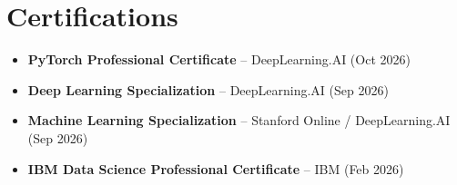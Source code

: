 \documentclass[letterpaper,11pt]{article}
\newenvironment{cvitems}{\begin{itemize}[leftmargin=0.21in,topsep=2pt,itemsep=1pt,parsep=0pt,partopsep=0pt]}{\end{itemize}}
\begin{document}
\section*{Certifications}
\begin{cvitems}
  \item \textbf{PyTorch Professional Certificate} -- DeepLearning.AI (Oct 2026)
  \item \textbf{Deep Learning Specialization} -- DeepLearning.AI (Sep 2026)
  \item \textbf{Machine Learning Specialization} -- Stanford Online / DeepLearning.AI (Sep 2026)
  \item \textbf{IBM Data Science Professional Certificate} -- IBM (Feb 2026)
\end{cvitems}
\end{document}
